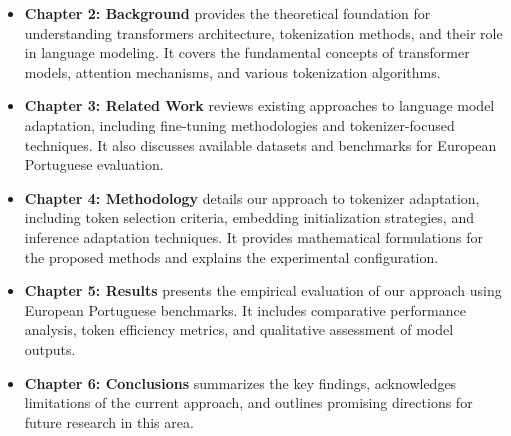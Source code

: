 \begin{itemize}
    \item \textbf{Chapter 2: Background} provides the theoretical foundation for understanding transformers architecture, tokenization methods, and their role in language modeling. It covers the fundamental concepts of transformer models, attention mechanisms, and various tokenization algorithms.
    
    \item \textbf{Chapter 3: Related Work} reviews existing approaches to language model adaptation, including fine-tuning methodologies and tokenizer-focused techniques. It also discusses available datasets and benchmarks for European Portuguese evaluation.
    
    \item \textbf{Chapter 4: Methodology} details our approach to tokenizer adaptation, including token selection criteria, embedding initialization strategies, and inference adaptation techniques. It provides mathematical formulations for the proposed methods and explains the experimental configuration.
    
    \item \textbf{Chapter 5: Results} presents the empirical evaluation of our approach using European Portuguese benchmarks. It includes comparative performance analysis, token efficiency metrics, and qualitative assessment of model outputs.
    
    \item \textbf{Chapter 6: Conclusions} summarizes the key findings, acknowledges limitations of the current approach, and outlines promising directions for future research in this area.
\end{itemize}
